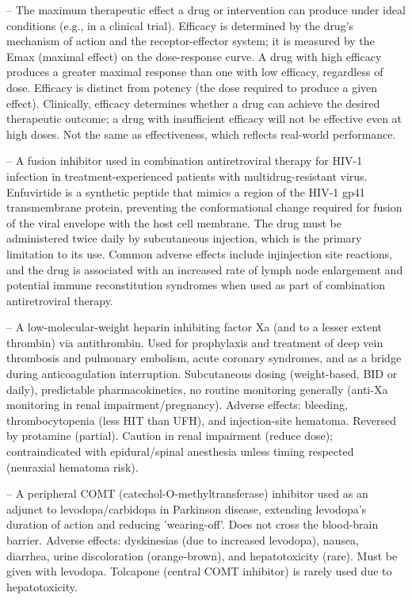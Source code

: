 -- The maximum therapeutic effect a drug or intervention can produce under ideal conditions (e.g., in a clinical trial). Efficacy is determined by the drug's mechanism of action and the receptor-effector system; it is measured by the Emax (maximal effect) on the dose-response curve. A drug with high efficacy produces a greater maximal response than one with low efficacy, regardless of dose. Efficacy is distinct from potency (the dose required to produce a given effect). Clinically, efficacy determines whether a drug can achieve the desired therapeutic outcome; a drug with insufficient efficacy will not be effective even at high doses. Not the same as effectiveness, which reflects real-world performance.

-- A fusion inhibitor used in combination antiretroviral therapy for HIV-1 infection in treatment-experienced patients with multidrug-resistant virus. Enfuvirtide is a synthetic peptide that mimics a region of the HIV-1 gp41 transmembrane protein, preventing the conformational change required for fusion of the viral envelope with the host cell membrane. The drug must be administered twice daily by subcutaneous injection, which is the primary limitation to its use. Common adverse effects include injinjection site reactions, and the drug is associated with an increased rate of lymph node enlargement and potential immune reconstitution syndromes when used as part of combination antiretroviral therapy.

-- A low-molecular-weight heparin inhibiting factor Xa (and to a lesser extent thrombin) via antithrombin. Used for prophylaxis and treatment of deep vein thrombosis and pulmonary embolism, acute coronary syndromes, and as a bridge during anticoagulation interruption. Subcutaneous dosing (weight-based, BID or daily), predictable pharmacokinetics, no routine monitoring generally (anti-Xa monitoring in renal impairment/pregnancy). Adverse effects: bleeding, thrombocytopenia (less HIT than UFH), and injection-site hematoma. Reversed by protamine (partial). Caution in renal impairment (reduce dose); contraindicated with epidural/spinal anesthesia unless timing respected (neuraxial hematoma risk).

-- A peripheral COMT (catechol-O-methyltransferase) inhibitor used as an adjunct to levodopa/carbidopa in Parkinson disease, extending levodopa's duration of action and reducing 'wearing-off'. Does not cross the blood-brain barrier. Adverse effects: dyskinesias (due to increased levodopa), nausea, diarrhea, urine discoloration (orange-brown), and hepatotoxicity (rare). Must be given with levodopa. Tolcapone (central COMT inhibitor) is rarely used due to hepatotoxicity.

